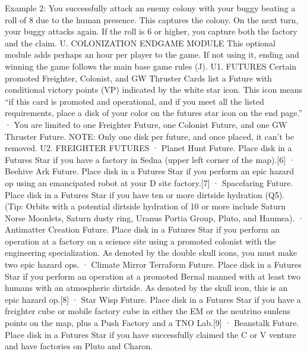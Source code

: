 \documentclass[a4paper]{book}
\begin{document}
Example 2: You successfully attack an enemy colony with your buggy beating a roll of 8 due to the human presence. This captures the colony.  On the next turn, your buggy attacks again. If the roll is 6 or higher, you capture both the factory and the claim.
U. COLONIZATION ENDGAME MODULE
This optional module adds perhaps an hour per player to the game. If not using it, ending and winning the game follows the main base game rules (J).
U1. FUTURES
Certain promoted Freighter, Colonist, and GW Thruster Cards list a Future with conditional victory points (VP) indicated by the white star icon. This icon means “if this card is promoted and operational, and if you meet all the listed requirements, place a disk of your color on the futures star icon on the end page.”
·       You are limited to one Freighter Future, one Colonist Future, and one GW Thruster Future.
NOTE: Only one disk per future, and once placed, it can’t be removed.
U2. FREIGHTER FUTURES
·       Planet Hunt Future. Place disk in a Futures Star if you have a factory in Sedna (upper left corner of the map).[6]
·       Beehive Ark Future. Place disk in a Futures Star if you perform an epic hazard op using an emancipated robot at your D site factory.[7]
·       Spacefaring Future. Place disk in a Futures Star if you have ten or more dirtside hydration (Q5). (Tip: Orbits with a potential dirtside hydration of 10 or more include Saturn Norse Moonlets, Saturn dusty ring, Uranus Portia Group, Pluto, and Haumea).
·       Antimatter Creation Future. Place disk in a Futures Star if you perform an operation at a factory on a science site using a promoted colonist with the engineering specialization. As denoted by the double skull icons, you must make two epic hazard ops.
·       Climate Mirror Terraform Future. Place disk in a Futures Star if you perform an operation at a promoted Bernal manned with at least two humans with an atmospheric dirtside. As denoted by the skull icon, this is an epic hazard op.[8]
·       Star Wisp Future. Place disk in a Futures Star if you have a freighter cube or mobile factory cube in either the EM or the neutrino sunlens points on the map, plus a Push Factory and a TNO Lab.[9]
·       Beanstalk Future. Place disk in a Futures Star if you have successfully claimed the C or V venture and have factories on Pluto and Charon.
\end{document}
